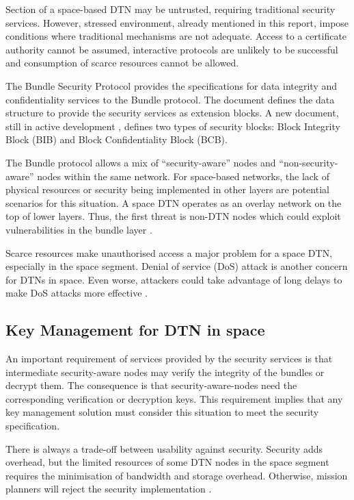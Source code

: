 Section of a space-based DTN may be untrusted, requiring traditional security services. However, stressed environment, already mentioned in this report, impose conditions where traditional mechanisms are not adequate. Access to a certificate authority cannot be assumed, interactive protocols are unlikely to be successful and consumption of scarce resources cannot be allowed. 
 
 The Bundle Security Protocol \cite{rfc6257} provides the specifications for data integrity and confidentiality services to the Bundle protocol. The document defines the data structure to provide the security services as extension blocks. A new document, still in active development \cite{ietf-dtn-bpsec-07}, defines two types of security blocks: Block Integrity Block (BIB) and Block Confidentiality Block (BCB).  
 
 
 
 The Bundle protocol allows a mix of ``security-aware'' nodes and ``non-security-aware'' nodes within the same network. For space-based networks, the lack of physical resources or security being implemented in other layers are potential scenarios for this situation. A space DTN operates as an overlay network on the top of lower layers. Thus, the first threat is non-DTN nodes which could exploit vulnerabilities in the bundle layer \cite{rfc6257}.
 
Scarce resources make unauthorised access a major problem for a space DTN, especially in the space segment. Denial of service (DoS) attack is another concern for DTNs in space. Even worse, attackers could take advantage of long delays to make DoS attacks more effective \cite{rfc6257}. 

 
\subsection{Key Management for DTN in space}

An important requirement of services provided by the security services is that intermediate security-aware nodes may verify the integrity of the bundles or decrypt them. The consequence is that security-aware-nodes need the corresponding verification or decryption keys. This requirement implies that any key management solution must consider this situation to meet the security specification. 

There is always a trade-off between usability against security. Security adds overhead, but the limited resources of some DTN nodes in the space segment requires the minimisation of bandwidth and storage overhead. Otherwise, mission planners will reject the security implementation \cite{book2012architecture}.


